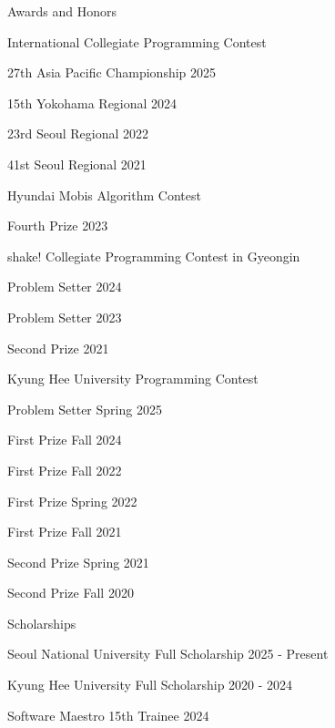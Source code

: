 \documentclass{resume}
\begin{document}
\begin{rSection}{Awards and Honors}

  \begin{rSubsection}{International Collegiate Programming Contest}{}{}{}
    \item 27th \hfill Asia Pacific Championship 2025
    \item 15th \hfill Yokohama Regional 2024
    \item 23rd \hfill Seoul Regional 2022
    \item 41st \hfill Seoul Regional 2021
  \end{rSubsection}

  \begin{rSubsection}{Hyundai Mobis Algorithm Contest}{}{}{}
    \item Fourth Prize \hfill 2023
  \end{rSubsection}

  \begin{rSubsection}{shake! Collegiate Programming Contest in Gyeongin}{}{}{}
    \item Problem Setter \hfill 2024
    \item Problem Setter \hfill 2023
    \item Second Prize \hfill 2021
  \end{rSubsection}

  \begin{rSubsection}{Kyung Hee University Programming Contest}{}{}{}
    \item Problem Setter \hfill Spring 2025
    \item First Prize \hfill Fall 2024
    \item First Prize \hfill Fall 2022
    \item First Prize \hfill Spring 2022
    \item First Prize \hfill Fall 2021
    \item Second Prize \hfill Spring 2021
    \item Second Prize \hfill Fall 2020
  \end{rSubsection}

  \begin{rSubsection}{Scholarships}{}{}{}
    \item Seoul National University Full Scholarship \hfill 2025 - Present
    \item Kyung Hee University Full Scholarship \hfill 2020 - 2024
    \item Software Maestro 15th Trainee \hfill 2024
  \end{rSubsection}


\end{rSection}
\end{document}
